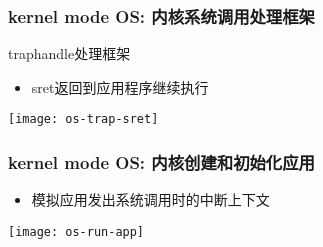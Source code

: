 \begin{frame}
    \frametitle{kernel mode OS: 内核系统调用处理框架}
    trap\-handle处理框架
    \begin{itemize}
        \item sret返回到应用程序继续执行
    \end{itemize}	
    \centering
    \texttt{[image: os-trap-sret]}
\end{frame}

\begin{frame}
    \frametitle{kernel mode OS: 内核创建和初始化应用}

    \begin{itemize}
        \item 模拟应用发出系统调用时的中断上下文
    \end{itemize}	
    \centering
    \texttt{[image: os-run-app]}
\end{frame}

